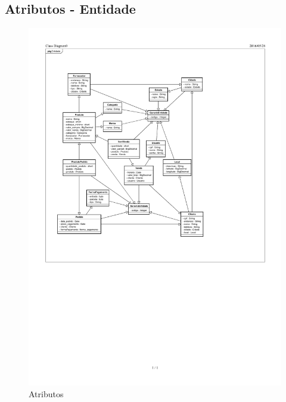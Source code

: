 \documentclass[chapter=TITLE,12pt,oneside,a4paper,english,french,sumario=tradicional,spanish,brazil,]{abntex2}
\begin{document}
\subsection{Atributos - Entidade}
\begin{figure}[H]\centering
\includegraphics[scale=1.31]{atributo.pdf}\caption{Atributos}
\end{figure}

\newpage
\end{document}
